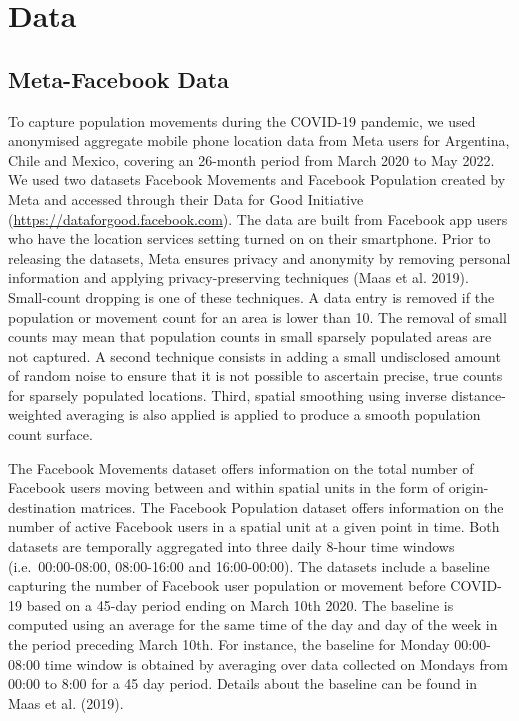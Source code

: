 \documentclass[
  11pt,
]{article}
\begin{document}
\hypertarget{sec-data}{%
\section{Data}\label{sec-data}}

\hypertarget{meta-facebook-data}{%
\subsection{Meta-Facebook Data}\label{meta-facebook-data}}

To capture population movements during the COVID-19 pandemic, we used
anonymised aggregate mobile phone location data from Meta users for
Argentina, Chile and Mexico, covering an 26-month period from March 2020
to May 2022. We used two datasets Facebook Movements and Facebook
Population created by Meta and accessed through their Data for Good
Initiative
(\href{https://dataforgood.facebook.com/}{https://dataforgood.facebook.com}).
The data are built from Facebook app users who have the location
services setting turned on on their smartphone. Prior to releasing the
datasets, Meta ensures privacy and anonymity by removing personal
information and applying privacy-preserving techniques (Maas et al.
2019). Small-count dropping is one of these techniques. A data entry is
removed if the population or movement count for an area is lower than
10. The removal of small counts may mean that population counts in small
sparsely populated areas are not captured. A second technique consists
in adding a small undisclosed amount of random noise to ensure that it
is not possible to ascertain precise, true counts for sparsely populated
locations. Third, spatial smoothing using inverse distance-weighted
averaging is also applied is applied to produce a smooth population
count surface.

The Facebook Movements dataset offers information on the total number of
Facebook users moving between and within spatial units in the form of
origin-destination matrices. The Facebook Population dataset offers
information on the number of active Facebook users in a spatial unit at
a given point in time. Both datasets are temporally aggregated into
three daily 8-hour time windows (i.e.~00:00-08:00, 08:00-16:00 and
16:00-00:00). The datasets include a baseline capturing the number of
Facebook user population or movement before COVID-19 based on a 45-day
period ending on March 10th 2020. The baseline is computed using an
average for the same time of the day and day of the week in the period
preceding March 10th. For instance, the baseline for Monday 00:00-08:00
time window is obtained by averaging over data collected on Mondays from
00:00 to 8:00 for a 45 day period. Details about the baseline can be
found in Maas et al. (2019).
\end{document}
